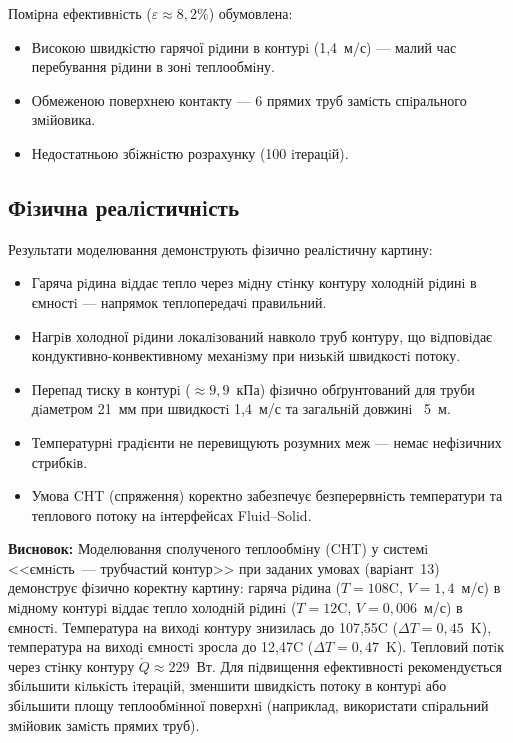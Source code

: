 Помiрна ефективнiсть ($\varepsilon \approx 8{,}2\%$) обумовлена:
\begin{itemize}
  \item Високою швидкiстю гарячої рiдини в контурi (1{,}4~м/с) --- малий час перебування рiдини в зонi теплообмiну.
  \item Обмеженою поверхнею контакту --- 6 прямих труб замiсть спiрального змiйовика.
  \item Недостатньою збiжнiстю розрахунку (100 iтерацiй).
\end{itemize}

\subsection{Фiзична реалiстичнiсть}

Результати моделювання демонструють фiзично реалiстичну картину:
\begin{itemize}
  \item Гаряча рiдина вiддає тепло через мiдну стiнку контуру холоднiй рiдинi в ємностi --- напрямок теплопередачi правильний.
  \item Нагрiв холодної рiдини локалiзований навколо труб контуру, що вiдповiдає кондуктивно-конвективному механiзму при низькiй швидкостi потоку.
  \item Перепад тиску в контурi ($\approx 9{,}9$~кПа) фiзично обґрунтований для труби дiаметром 21~мм при швидкостi 1{,}4~м/с та загальнiй довжинi ~5~м.
  \item Температурнi градiєнти не перевищують розумних меж --- немає нефiзичних стрибкiв.
  \item Умова CHT (спряження) коректно забезпечує безперервнiсть температури та теплового потоку на iнтерфейсах Fluid--Solid.
\end{itemize}

\textbf{Висновок:} Моделювання сполученого теплообмiну (CHT) у системi <<ємнiсть~--- трубчастий контур>> при заданих умовах (варiант~13) демонструє фiзично коректну картину: гаряча рiдина ($T=108$\textdegree C, $V=1{,}4$~м/с) в мiдному контурi вiддає тепло холоднiй рiдинi ($T=12$\textdegree C, $V=0{,}006$~м/с) в ємностi. Температура на виходi контуру знизилась до 107{,}55\textdegree C ($\Delta T = 0{,}45$~K), температура на виходi ємностi зросла до 12{,}47\textdegree C ($\Delta T = 0{,}47$~K). Тепловий потiк через стiнку контуру $\dot{Q} \approx 229$~Вт. Для пiдвищення ефективностi рекомендується збiльшити кiлькiсть iтерацiй, зменшити швидкiсть потоку в контурi або збiльшити площу теплообмiнної поверхнi (наприклад, використати спiральний змiйовик замiсть прямих труб).

